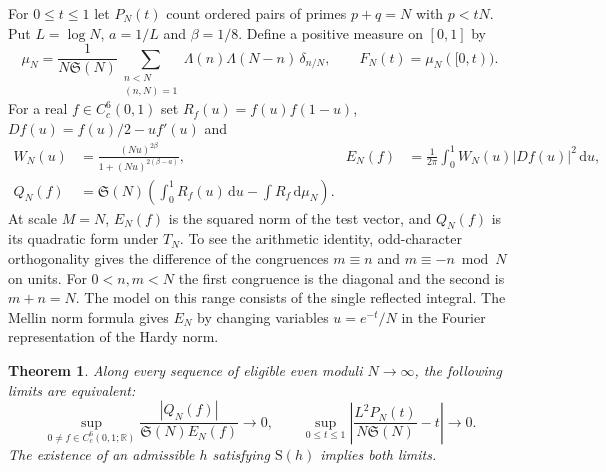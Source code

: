 \documentclass[11pt,a4paper]{article}
\newtheorem{theorem}{Theorem}[section]
\newcommand{\SSg}{\mathfrak S}
\newcommand{\dd}{\,\mathrm d}
\begin{document}
For $0\le t\le1$ let $P_N(t)$ count ordered pairs of primes $p+q=N$ with $p<tN$. Put $L=\log N$, $a=1/L$ and $\beta=1/8$. Define a positive measure on $[0,1]$ by
\[
 \mu_N=\frac{1}{N\SSg(N)}
 \sum_{\substack{n<N\\(n,N)=1}}\Lambda(n)\Lambda(N-n)\,\delta_{n/N},
 \qquad F_N(t)=\mu_N([0,t)).
\]
For a real $f\in C_c^6(0,1)$ set $R_f(u)=f(u)f(1-u)$, $Df(u)=f(u)/2-u f'(u)$ and
\begin{align*}
 W_N(u)&=\frac{(Nu)^{2\beta}}{1+(Nu)^{2(\beta-a)}},&
 E_N(f)&=\frac{1}{2\pi}\int_0^1 W_N(u)|Df(u)|^2\dd u,\\
 Q_N(f)&=\SSg(N)\left(\int_0^1 R_f(u)\dd u-\int R_f\dd\mu_N\right).
\end{align*}
At scale $M=N$, $E_N(f)$ is the squared norm of the test vector, and $Q_N(f)$ is its quadratic form under $T_N$. To see the arithmetic identity, odd-character orthogonality gives the difference of the congruences $m\equiv n$ and $m\equiv-n\bmod N$ on units. For $0<n,m<N$ the first congruence is the diagonal and the second is $m+n=N$. The model on this range consists of the single reflected integral. The Mellin norm formula gives $E_N$ by changing variables $u=e^{-t}/N$ in the Fourier representation of the Hardy norm.

\begin{theorem}\label{th:sharp}
Along every sequence of eligible even moduli $N\to\infty$, the following limits are equivalent:
\[
 \sup_{0\ne f\in C_c^6(0,1;\mathbb R)}
 \frac{|Q_N(f)|}{\SSg(N)E_N(f)}\longrightarrow0,
 \qquad
 \sup_{0\le t\le1}\left|\frac{L^2P_N(t)}{N\SSg(N)}-t\right|
 \longrightarrow0.
\]
The existence of an admissible $h$ satisfying $\mathrm S(h)$ implies both limits.
\end{theorem}
\end{document}
